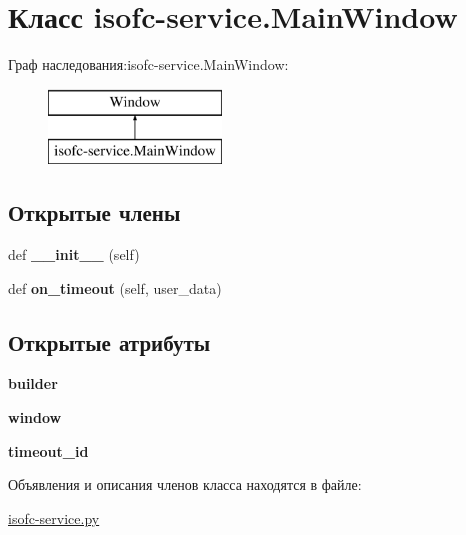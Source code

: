 \hypertarget{classisofc-service_1_1MainWindow}{}\section{Класс isofc-\/service.Main\+Window}
\label{classisofc-service_1_1MainWindow}
Граф наследования\+:isofc-\/service.Main\+Window\+:\begin{figure}[H]
\begin{center}
\leavevmode
\includegraphics[height=2.000000cm]{classisofc-service_1_1MainWindow}
\end{center}
\end{figure}
\subsection*{Открытые члены}
\begin{DoxyCompactItemize}
\item 
\mbox{\label{classisofc-service_1_1MainWindow_ab4e6960b2b7b0b252e77ce3c031c29ab}} 
def {\bfseries \+\_\+\+\_\+init\+\_\+\+\_\+} (self)
\item 
\mbox{\label{classisofc-service_1_1MainWindow_a462bf7f82d407091cb73d69b2c8d8dba}} 
def {\bfseries on\+\_\+timeout} (self, user\+\_\+data)
\end{DoxyCompactItemize}
\subsection*{Открытые атрибуты}
\begin{DoxyCompactItemize}
\item 
\mbox{\label{classisofc-service_1_1MainWindow_abf39846603fd825db796670c62251722}} 
{\bfseries builder}
\item 
\mbox{\label{classisofc-service_1_1MainWindow_a9372c074611818606ac869373a871f1c}} 
{\bfseries window}
\item 
\mbox{\label{classisofc-service_1_1MainWindow_ac824212053c53130fc365cd5208f4cc1}} 
{\bfseries timeout\+\_\+id}
\end{DoxyCompactItemize}


Объявления и описания членов класса находятся в файле\+:\begin{DoxyCompactItemize}
\item 
\mbox{\hyperlink{isofc-service_8py}{isofc-\/service.\+py}}\end{DoxyCompactItemize}
